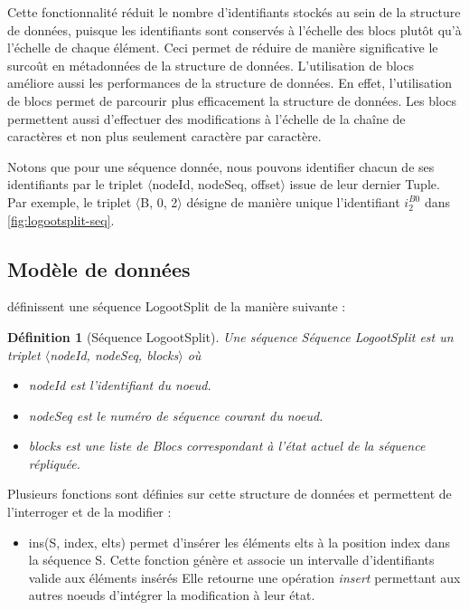\documentclass[12pt]{thesul}
\newtheorem{definition}{Définition}
\newcommand{\trm}[1]{\mathit{#1}}
\newcommand{\id}[3]{$\trm{#1}^{\trm{#2}}_{\trm{#3}}$}
\begin{document}
Cette fonctionnalité réduit le nombre d'identifiants stockés au sein de la structure de données, puisque les identifiants sont conservés à l'échelle des blocs plutôt qu'à l'échelle de chaque élément.
Ceci permet de réduire de manière significative le surcoût en métadonnées de la structure de données.
L'utilisation de blocs améliore aussi les performances de la structure de données.
En effet, l'utilisation de blocs permet de parcourir plus efficacement la structure de données.
Les blocs permettent aussi d'effectuer des modifications à l'échelle de la chaîne de caractères et non plus seulement caractère par caractère.


Notons que pour une séquence donnée, nous pouvons identifier chacun de ses identifiants par le triplet $\langle$nodeId, nodeSeq, offset$\rangle$ issue de leur dernier Tuple.
Par exemple, le triplet $\langle$B, 0, 2$\rangle$ désigne de manière unique l'identifiant \id{i}{B0}{2} dans \autoref{fig:logootsplit-seq}.

\subsection{Modèle de données}

\textcite{2013-logootsplit} définissent une séquence LogootSplit de la manière suivante :

\begin{definition}[Séquence LogootSplit]
  \label{def:logootsplit}
  Une séquence \emph{Séquence LogootSplit} est un triplet $\langle$nodeId, nodeSeq, blocks$\rangle$ où
  \begin{itemize}
    \item nodeId est l'identifiant du noeud.
    \item nodeSeq est le numéro de séquence courant du noeud.
    \item blocks est une liste de Blocs correspondant à l'état actuel de la séquence répliquée.
  \end{itemize}
\end{definition}

Plusieurs fonctions sont définies sur cette structure de données et permettent de l'interroger et de la modifier :

\begin{itemize}
  \item ins(S, index, elts) permet d'insérer les éléments elts à la position index dans la séquence S.
    Cette fonction génère et associe un intervalle d'identifiants valide aux éléments insérés
    Elle retourne une opération \emph{insert} permettant aux autres noeuds d'intégrer la modification à leur état.
\end{itemize}
\end{document}
